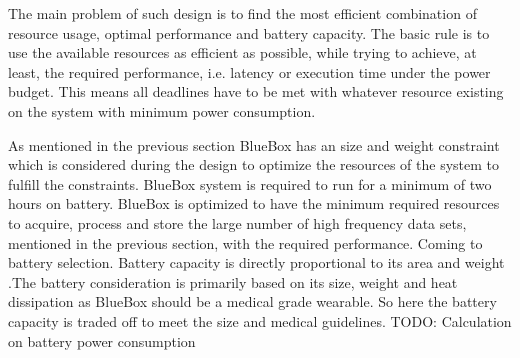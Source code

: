 \hspace{10mm}The main problem of such design is to find the most efficient combination of resource usage, optimal performance and battery capacity. The basic rule is to use the available resources as efficient as possible, while trying to achieve, at least, the required performance, i.e. latency or execution time under the power budget. This means all deadlines have to be met with whatever resource existing on the system with minimum power consumption. 


\hspace{10mm}As mentioned in the previous section BlueBox has an size and weight constraint which is considered during the design to optimize the resources of the system to fulfill the constraints. BlueBox system is required to run for a minimum of two hours on battery.  
BlueBox is optimized to have the minimum required resources to acquire, process and store the large number of high frequency data sets, mentioned in the previous section, with the required performance.  
Coming to battery selection. Battery capacity is directly proportional to its area and weight\cite{} .The battery consideration is primarily based on its size, weight and heat dissipation as BlueBox should be a medical grade wearable. So here the battery capacity is traded off to meet the size and medical guidelines.  
TODO: Calculation on battery power consumption

